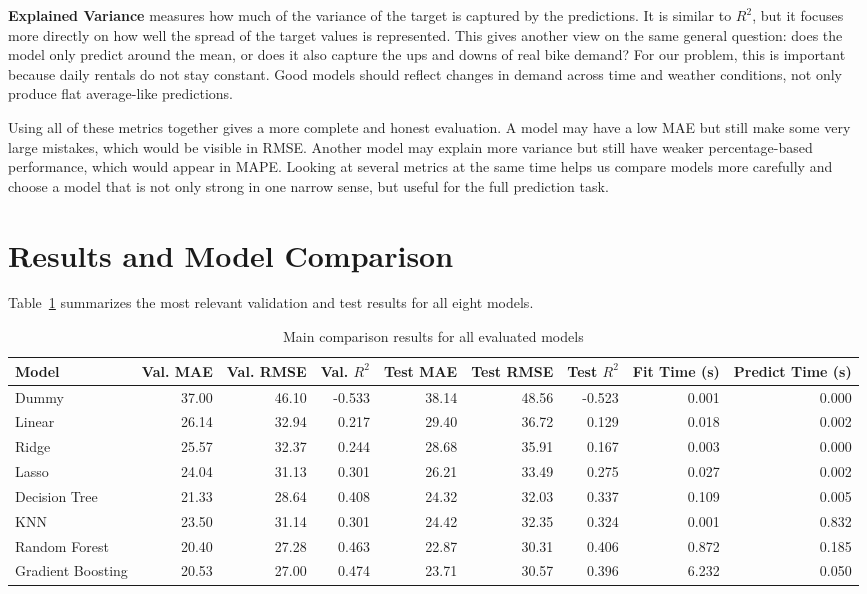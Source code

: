\documentclass[conference]{IEEEtran}
\begin{document}
\textbf{Explained Variance} measures how much of the variance of the target is captured by the predictions. It is similar to 
$R^2$, but it focuses more directly on how well the spread of the target values is represented. This gives another view on the 
same general question: does the model only predict around the mean, or does it also capture the ups and downs of real bike demand? 
For our problem, this is important because daily rentals do not stay constant. Good models should reflect changes in demand across 
time and weather conditions, not only produce flat average-like predictions.

Using all of these metrics together gives a more complete and honest evaluation. A model may have a low MAE but still make some 
very large mistakes, which would be visible in RMSE. Another model may explain more variance but still have weaker percentage-based 
performance, which would appear in MAPE. Looking at several metrics at the same time helps us compare models more carefully and 
choose a model that is not only strong in one narrow sense, but useful for the full prediction task.
\section{Results and Model Comparison}
Table~\ref{tab:main-results} summarizes the most relevant validation and test results for all eight models.

\begin{table}[t]
\caption{Main comparison results for all evaluated models}
\label{tab:main-results}
\centering
\footnotesize
\begin{tabular}{lrrrrrrrr}
\toprule
Model & Val. MAE & Val. RMSE & Val. $R^2$ & Test MAE & Test RMSE & Test $R^2$ & Fit Time (s) & Predict Time (s) \\
\midrule
Dummy             & 37.00 & 46.10 & -0.533 & 38.14 & 48.56 & -0.523 & 0.001 & 0.000 \\
Linear            & 26.14 & 32.94 &  0.217 & 29.40 & 36.72 &  0.129 & 0.018 & 0.002 \\
Ridge             & 25.57 & 32.37 &  0.244 & 28.68 & 35.91 &  0.167 & 0.003 & 0.000 \\
Lasso             & 24.04 & 31.13 &  0.301 & 26.21 & 33.49 &  0.275 & 0.027 & 0.002 \\
Decision Tree     & 21.33 & 28.64 &  0.408 & 24.32 & 32.03 &  0.337 & 0.109 & 0.005 \\
KNN               & 23.50 & 31.14 &  0.301 & 24.42 & 32.35 &  0.324 & 0.001 & 0.832 \\
Random Forest     & 20.40 & 27.28 &  0.463 & 22.87 & 30.31 &  0.406 & 0.872 & 0.185 \\
Gradient Boosting & 20.53 & 27.00 &  0.474 & 23.71 & 30.57 &  0.396 & 6.232 & 0.050 \\
\bottomrule
\end{tabular}
\end{table}
\end{document}

